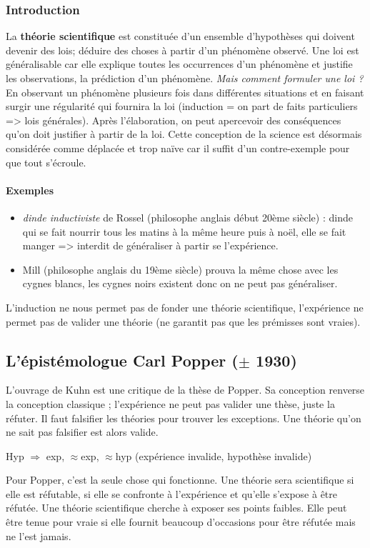 \documentclass[11pt,a4paper]{article} %
\begin{document}
\subsubsection{Introduction}
La \textbf{théorie scientifique} est constituée d'un ensemble d'hypothèses qui doivent devenir des lois; déduire des choses à partir d'un phénomène observé.
Une loi est généralisable car elle explique toutes les occurrences d'un phénomène et justifie les observations, la prédiction d'un phénomène.
\emph{Mais comment formuler une loi ?} En observant un phénomène plusieurs fois dans différentes situations et en faisant surgir une régularité qui fournira la loi (induction = on part de faits particuliers => lois générales).
Après l'élaboration, on peut apercevoir des conséquences qu'on doit justifier à partir de la loi.
Cette conception de la science est désormais considérée comme déplacée et trop naïve car il suffit d'un contre-exemple pour que tout s'écroule.
\paragraph{Exemples}
\begin{itemize}
	\item \emph{dinde inductiviste} de Rossel (philosophe anglais début 20ème siècle) : dinde qui se fait nourrir tous les matins à la même heure puis à noël, elle se fait manger => interdit de généraliser à partir se l'expérience.
	\item Mill (philosophe anglais du 19ème siècle) prouva la même chose avec les cygnes blancs, les cygnes noirs existent donc on ne peut pas généraliser.
\end{itemize}
L'induction ne nous permet pas de fonder une théorie scientifique, l'expérience ne permet pas de valider une théorie (ne garantit pas que les prémisses sont vraies).
\subsection{L'épistémologue Carl Popper ($\pm$ 1930)}
L'ouvrage de Kuhn est une critique de la thèse de Popper.
Sa conception renverse la conception classique ; l'expérience ne peut pas valider une thèse, juste la réfuter.
Il faut falsifier les théories pour trouver les exceptions.
Une théorie qu'on ne sait pas falsifier est alors valide.

Hyp $\Rightarrow$ exp, $\approx$exp, $\approx$hyp (expérience invalide, hypothèse invalide)

Pour Popper, c'est la seule chose qui fonctionne.
Une théorie sera scientifique si elle est réfutable, si elle se confronte à l'expérience et qu'elle s'expose à être réfutée.
Une théorie scientifique cherche à exposer ses points faibles.
Elle peut être tenue pour vraie si elle fournit beaucoup d'occasions pour être réfutée mais ne l'est jamais.
\end{document}
